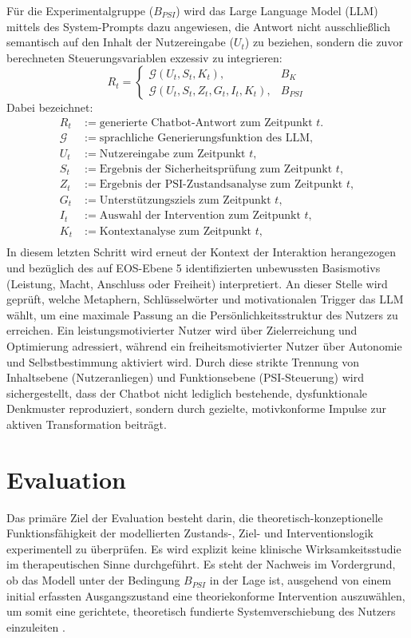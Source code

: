 Für die Experimentalgruppe ($B_{PSI}$) wird das Large Language Model (LLM) mittels des System-Prompts dazu angewiesen, die Antwort nicht ausschließlich semantisch auf den Inhalt der Nutzereingabe ($U_t$) zu beziehen, sondern die zuvor berechneten Steuerungsvariablen exzessiv zu integrieren:
\[
R_t =
\begin{cases}
    \mathcal{G}(U_t,S_t,K_t), & B_K \\[6pt]
    \mathcal{G}(U_t,S_t,Z_t,G_t,I_t,K_t), & B_{PSI}
\end{cases}
\]
Dabei bezeichnet:
\[
\begin{aligned}
R_t &:= \text{generierte Chatbot-Antwort zum Zeitpunkt } t.\\
\mathcal{G} &:= \text{sprachliche Generierungsfunktion des LLM},\\
U_t &:= \text{Nutzereingabe zum Zeitpunkt } t,\\
S_t &:= \text{Ergebnis der Sicherheitsprüfung zum Zeitpunkt } t,\\
Z_t &:= \text{Ergebnis der PSI-Zustandsanalyse zum Zeitpunkt } t,\\
G_t &:= \text{Unterstützungsziels zum Zeitpunkt } t,\\
I_t &:= \text{Auswahl der Intervention zum Zeitpunkt } t,\\
K_t &:= \text{Kontextanalyse zum Zeitpunkt } t,\\
\end{aligned}
\]
In diesem letzten Schritt wird erneut der Kontext der Interaktion herangezogen und bezüglich des auf EOS-Ebene 5 identifizierten unbewussten Basismotivs (Leistung, Macht, Anschluss oder Freiheit) interpretiert. An dieser Stelle wird geprüft, welche Metaphern, Schlüsselwörter und motivationalen Trigger das LLM wählt, um eine maximale Passung an die Persönlichkeitsstruktur des Nutzers zu erreichen. Ein leistungsmotivierter Nutzer wird über Zielerreichung und Optimierung adressiert, während ein freiheitsmotivierter Nutzer über Autonomie und Selbstbestimmung aktiviert wird. Durch diese strikte Trennung von Inhaltsebene (Nutzeranliegen) und Funktionsebene (PSI-Steuerung) wird sichergestellt, dass der Chatbot nicht lediglich bestehende, dysfunktionale Denkmuster reproduziert, sondern durch gezielte, motivkonforme Impulse zur aktiven Transformation beiträgt.

\section{Evaluation}
Das primäre Ziel der Evaluation besteht darin, die theoretisch-konzeptionelle Funktionsfähigkeit der modellierten Zustands-, Ziel- und Interventionslogik experimentell zu überprüfen. 
Es wird explizit keine klinische Wirksamkeitsstudie im therapeutischen Sinne durchgeführt. Es steht der Nachweis im Vordergrund, ob das Modell unter der Bedingung $B_{PSI}$ in der Lage ist, ausgehend von einem initial erfassten Ausgangszustand eine theoriekonforme Intervention auszuwählen, um somit eine gerichtete, theoretisch fundierte Systemverschiebung des Nutzers einzuleiten \citep{kuhl2005neue}. \\

